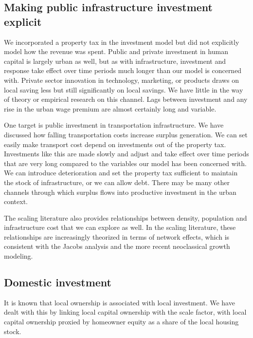 \subsection{Making public infrastructure investment explicit}
We incorporated a property tax in the investment model but did not explicitly model how the revenue was spent. Public and private investment in human capital is largely urban as well, but as with infrastructure, investment and response take effect over time periods much longer than our model is concerned with. Private sector innovation in technology, marketing, or products draws on local saving less but still significantly on local savings. We have little in the way of theory or empirical research on this channel. Lags between investment and any rise in the urban wage premium are almost certainly long and variable. 

One target is public investment in transportation infrastructure. We have discussed how falling transportation costs increase surplus generation.  We can set easily make transport cost depend on investments out of the property tax. Investments like this are made slowly and adjust and take effect over time periods that are very long compared to the variables our model has been concerned with. We can introduce deterioration and set the property tax sufficient to maintain the stock of infrastructure,  or we can allow debt. 
There may be many other channels through which surplus flows into productive investment in the urban context. 

The scaling literature also provides relationships between density, population and infrastructure cost that we can explore as well. In the scaling literature, these relationships are increasingly theorized in terms of network effects, which is consistent with the Jacobs analysis and the more recent neoclassical growth modeling.


\subsection{Domestic investment}
 It is known that local ownership is associated with local investment. We have dealt with this by linking local capital ownership with the scale factor, with local capital ownership proxied by homeowner equity as a share of the local housing stock.

